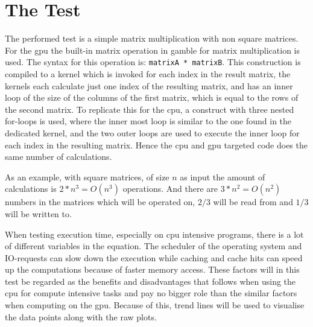 \section{The Test} %
\label{sec:the_test}
The performed test is a simple matrix multiplication with non square matrices.
For the \gls{gpu} the built-in matrix operation in \gls{gamble} for matrix multiplication is used. 
The syntax for this operation is: \texttt{matrixA * matrixB}. 
This construction is compiled to a kernel which is invoked for each index in the result matrix, the kernels each calculate just one index of the resulting matrix, and has an inner loop of the size of the columns of the first matrix, which is equal to the rows of the second matrix.
To replicate this for the \gls{cpu}, a construct with three nested for-loops is used, where the inner most loop is similar to the one found in the dedicated kernel, and the two outer loops are used to execute the inner loop for each index in the resulting matrix.
Hence the \gls{cpu} and \gls{gpu} targeted code does the same number of calculations.
 
As an example, with square matrices, of size $n$ as input the amount of calculations is $2*n^3 = O(n^3)$ operations. 
And there are $3*n^2 = O(n^2)$ numbers in the matrices which will be operated on, $2/3$ will be read from and $1/3$ will be written to.

When testing execution time, especially on \gls{cpu} intensive programs, there is a lot of different variables in the equation. 
The scheduler of the operating system and IO-requests can slow down the execution while caching and cache hits can speed up the computations because of faster memory access. 
These factors will in this test be regarded as the benefits and disadvantages that follows when using the \gls{cpu} for compute intensive tasks and pay no bigger role than the similar factors when computing on the \gls{gpu}.
Because of this, trend lines will be used to visualise the data points along with the raw plots. 

